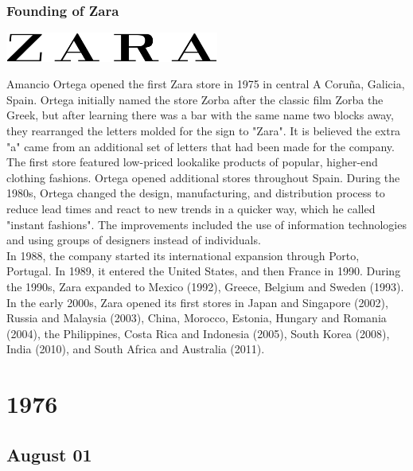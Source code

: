 \documentclass[11pt]{report}
\begin{document}
\subsection{Founding of Zara}
\vspace{2mm}\begin{center}\includegraphics[width=7cm]{./img/zaraLogo.jpg}\end{center}
Amancio Ortega opened the first Zara store in 1975 in central A Coruña, Galicia, Spain. Ortega initially named the store Zorba after the classic film Zorba the Greek, but after learning there was a bar with the same name two blocks away, they rearranged the letters molded for the sign to "Zara". It is believed the extra "a" came from an additional set of letters that had been made for the company. The first store featured low-priced lookalike products of popular, higher-end clothing fashions. Ortega opened additional stores throughout Spain. During the 1980s, Ortega changed the design, manufacturing, and distribution process to reduce lead times and react to new trends in a quicker way, which he called "instant fashions". The improvements included the use of information technologies and using groups of designers instead of individuals.\\ \indent In 1988, the company started its international expansion through Porto, Portugal. In 1989, it entered the United States, and then France in 1990. During the 1990s, Zara expanded to Mexico (1992), Greece, Belgium and Sweden (1993). In the early 2000s, Zara opened its first stores in Japan and Singapore (2002), Russia and Malaysia (2003), China, Morocco, Estonia, Hungary and Romania (2004), the Philippines, Costa Rica and Indonesia (2005), South Korea (2008), India (2010), and South Africa and Australia (2011).

\chapter{1976}
\section{August 01}
\end{document}
